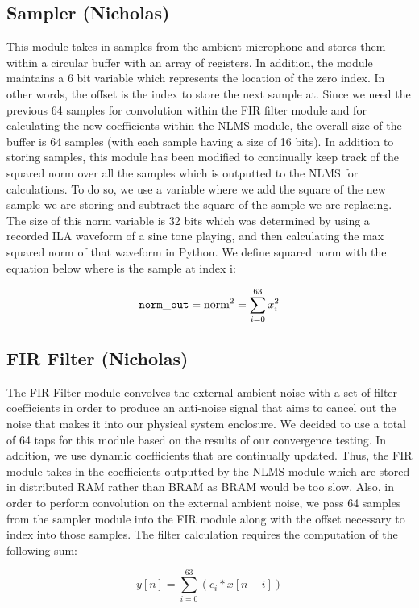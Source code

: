 \documentclass{fpgairpods}
\begin{document}
\subsection{Sampler (Nicholas)}
This module takes in samples from the ambient microphone and stores them within a circular buffer with an array of registers. In addition, the module maintains a 6 bit  variable which represents the location of the zero index. In other words, the offset is the index to store the next sample at. Since we need the previous 64 samples for convolution within the FIR filter module and for calculating the new coefficients within the NLMS module, the overall size of the buffer is 64 samples (with each sample having a size of 16 bits). In addition to storing samples, this module has been modified to continually keep track of the squared norm over all the samples which is outputted to the NLMS for calculations. To do so, we use a  variable where we add the square of the new sample we are storing and subtract the square of the sample we are replacing. The size of this norm variable is 32 bits which was determined by using a recorded ILA waveform of a sine tone playing, and then calculating the max squared norm of that waveform in Python. We define squared norm with the equation below where  is the sample at index i:

$$\ttt{norm_out} = \text{norm}^2 = \sum_{i=0}^{63} x_i^2  $$


\subsection{FIR Filter (Nicholas)}
The FIR Filter module convolves the external ambient noise with a set of filter coefficients in order to produce an anti-noise signal that aims to cancel out the noise that makes it into our physical system enclosure. We decided to use a total of 64 taps for this module based on the results of our convergence testing. In addition, we use dynamic coefficients that are continually updated. Thus, the FIR module takes in the coefficients outputted by the NLMS module which are stored in distributed RAM rather than BRAM as BRAM would be too slow. Also, in order to perform convolution on the external ambient noise, we pass 64 samples from the sampler module into the FIR module along with the offset necessary to index into those samples. The filter calculation requires the computation of the following sum:

$$ y[n] = \sum_{i=0}^{63} (c_i * x[n-i]) $$
\end{document}

